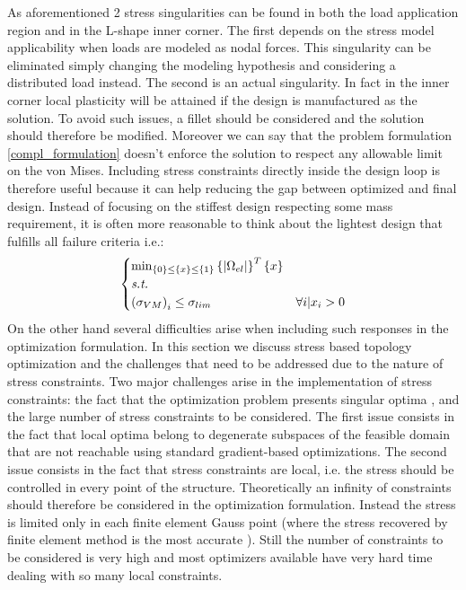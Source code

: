As aforementioned 2 stress singularities can be found in both the load application region and in the L-shape inner corner. 
The first depends on the stress model applicability when loads are modeled as nodal forces. This singularity can be eliminated simply changing the modeling hypothesis and considering a distributed load instead. The second is an actual singularity. In fact in the inner corner local plasticity will be attained if the design is manufactured as the solution. To avoid such issues, a fillet should be considered and the solution should therefore be modified. 
Moreover we can say that the problem formulation \ref{compl_formulation} doesn't enforce the solution to respect any allowable limit on the von Mises.
Including stress constraints directly inside the design loop is therefore useful because it can help reducing the gap between optimized and final design. Instead of focusing on the stiffest design respecting some mass requirement, it is often more reasonable to think about the lightest design that fulfills all failure criteria i.e.:
\begin{equation}
\label{formulation_stress}
\begin{cases}
\min_{\left\lbrace{0}\right \rbrace\leq\left\lbrace{x}\right \rbrace\leq\left\lbrace{1}\right \rbrace} {\left\lbrace{|\Omega_{el}|}\right \rbrace^T\left\lbrace{x}\right \rbrace} \\
\textit{s.t.}\\
\left(\sigma_{VM}\right)_i\leq \sigma_{lim} & \forall i|x_i>0
\end{cases}
\end{equation}
On the other hand several difficulties arise when including such responses in the optimization formulation. 
In this section we discuss stress based topology optimization and the challenges that need to be addressed due to the nature of stress constraints.
Two major challenges arise in the implementation of stress constraints: the fact that the optimization problem presents singular optima \cite{rozvany2001design}, and the large number of stress constraints to be considered.
The first issue consists in the fact that local optima belong to degenerate subspaces of the feasible domain that are not reachable using standard gradient-based optimizations.  The second issue consists in the fact that stress constraints are local, i.e. the stress should be controlled in every point of the structure. Theoretically an infinity of constraints should therefore be considered in the optimization formulation. Instead the stress is limited only in each finite element Gauss point (where the stress recovered by finite element method is the most accurate \cite{zlamal1978superconvergence,zhang2006natural}). Still the number of constraints to be considered is very high and most optimizers available have very hard time dealing with so many local constraints.
